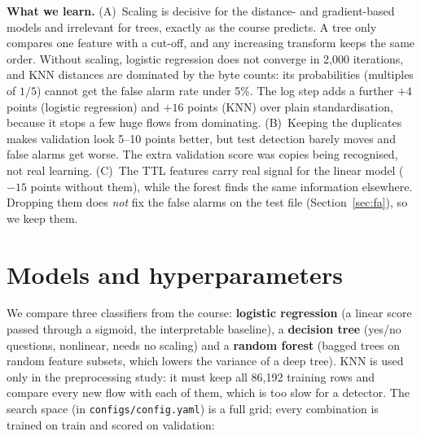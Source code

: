 \documentclass[11pt,a4paper]{article}
\begin{document}
\textbf{What we learn.}
(A)~Scaling is decisive for the distance- and gradient-based models and irrelevant for trees, exactly
as the course predicts. A tree only compares one feature with a cut-off, and any increasing transform
keeps the same order. Without scaling, logistic regression does not converge in 2{,}000 iterations,
and KNN distances are dominated by the byte counts: its probabilities (multiples of $1/5$) cannot get
the false alarm rate under 5\%. The log step adds a further $+4$ points (logistic regression) and
$+16$ points (KNN) over plain standardisation, because it stops a few huge flows from dominating.
(B)~Keeping the duplicates makes validation look 5--10 points better, but test detection barely moves
and false alarms get worse. The extra validation score was copies being recognised, not real
learning. (C)~The TTL features carry real signal for the linear model ($-15$ points without them),
while the forest finds the same information elsewhere. Dropping them does \emph{not} fix the false
alarms on the test file (Section~\ref{sec:fa}), so we keep them.

\section{Models and hyperparameters}

We compare three classifiers from the course: \textbf{logistic regression} (a linear score passed
through a sigmoid, the interpretable baseline), a \textbf{decision tree} (yes/no questions,
nonlinear, needs no scaling) and a \textbf{random forest} (bagged trees on random feature subsets,
which lowers the variance of a deep tree). KNN is used only in the preprocessing study: it must keep
all 86{,}192 training rows and compare every new flow with each of them, which is too slow for a
detector. The search space (in \texttt{configs/config.yaml}) is a full grid; every combination is
trained on train and scored on validation:
\end{document}
